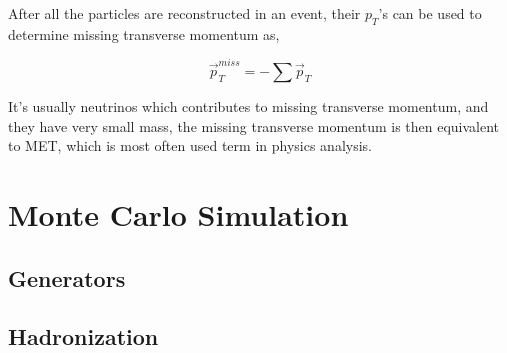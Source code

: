 After all the particles are reconstructed in an event, their \( p_T \)'s
can be used to determine missing transverse momentum as,

\begin{equation}
  \vec{p}_{T}^{miss} = - \sum \vec{p}_{T}
\end{equation}

It's usually neutrinos which contributes to missing transverse momentum,
and they have very small mass, the missing transverse momentum is then
equivalent to \gls{MET}, which is most often used term in physics analysis.

\section{
  Monte Carlo Simulation
 }

\subsection{
  Generators
}

\subsection{
  Hadronization
}

